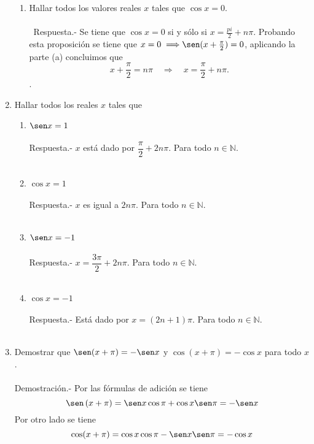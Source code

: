 \begin{enumerate}[\bfseries 1.]
\begin{enumerate}{\bfseries (a)}
    \item Hallar todos los valores reales $x$ tales que $\cos x =0$.\\\\\
	Respuesta.-\; Se tiene que  $\cos x=0$ si y sólo si $x=\frac{pi}{2}+n\pi$. Probando esta proposición se tiene que $x=0\;\Longrightarrow \sen(x+\frac{\pi}{2})=0$, aplicando la parte (a) concluimos que $$x+\dfrac{\pi}{2}=n\pi \quad \Longrightarrow \quad x=\dfrac{\pi}{2}+n\pi.$$.\\

\end{enumerate}

\item Hallar todos los reales $x$ tales que 
\begin{enumerate}[\bfseries a)]
    
    \item $\sen x = 1$\\\\
	Respuesta.-\; $x$ está dado por $\dfrac{\pi}{2}+2n\pi$. Para todo $n \in \mathbb{N}$.\\\\

    \item $\cos x = 1$\\\\
	Respuesta.-\; $x$ es igual a $2n\pi.$ Para todo $n \in \mathbb{N}$.\\\\

    \item $\sen x = -1$\\\\
	Respuesta.-\; $x=\dfrac{3\pi}{2}+2n\pi$. Para todo $n \in \mathbb{N}$.\\\\

    \item $\cos x = -1$\\\\
	Respuesta.-\; Está dado por $x=(2n+1)\pi$. Para todo $n \in \mathbb{N}$.\\\\

\end{enumerate}

\item Demostrar que $\sen(x+\pi) = -\sen x$ y $\cos(x+\pi) = -\cos x$ para todo $x$.\\\\
    Demostración.-\; Por las fórmulas de adición se tiene $$\sen\left(x+\pi\right) = \sen x \cos \pi +\cos x \sen \pi = -\sen x$$ 
	Por otro lado se tiene $$\cos (x+\pi) = \cos x \cos \pi - \sen x \sen \pi = -\cos x$$\\


\end{enumerate}
